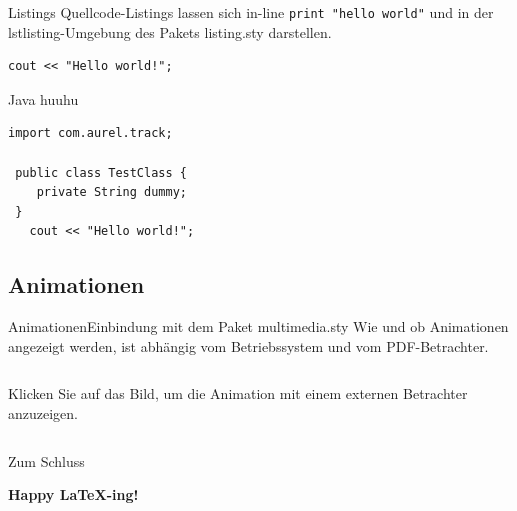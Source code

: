 \begin{frame}[fragile]{Listings}
Quellcode-Listings lassen sich in-line \lstinline|print "hello world"| und in
der lstlisting-Umgebung des Pakets listing.sty darstellen.

\begin{lstlisting}[frame=single, emph={cout}, emphstyle={\color{blue}}]
   cout << "Hello world!";
\end{lstlisting}
\end{frame}

\begin{frame}[fragile]{Java}
huuhu
\begin{lstlisting}[frame=single]
   import com.aurel.track;

 public class TestClass {
    private String dummy;
 }
   cout << "Hello world!";
\end{lstlisting}
\end{frame}

\subsection{Animationen}

\begin{frame}{Animationen}{Einbindung mit dem Paket multimedia.sty}
Wie und ob Animationen angezeigt werden, ist abhängig vom Betriebssystem und
vom PDF-Betrachter.

\begin{columns}
Klicken Sie auf das Bild, um die Animation mit einem externen Betrachter anzuzeigen.
\end{columns}
\end{frame}




\begin{frame}{Zum Schluss}
  \begin{center}
    {\Huge \textcolor{HEblue6}{\bf Happy \LaTeX{}-ing!}}
  \end{center}
\end{frame}



